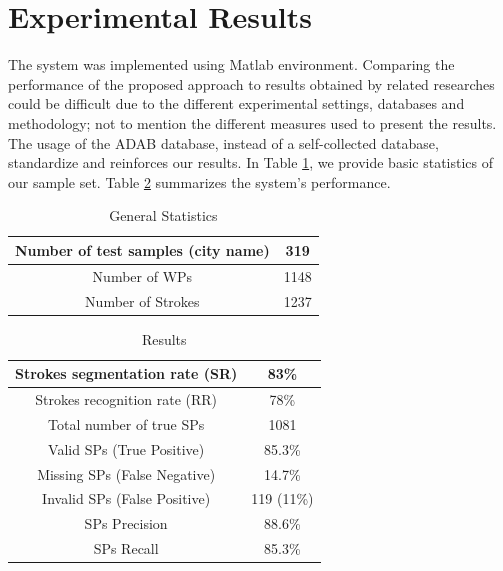 \documentclass[10pt, conference, compsocconf]{IEEEtran}
\begin{document}
\section{Experimental Results}
\label{sec:results}
The system was implemented using Matlab environment. 
Comparing the performance of the proposed approach to results obtained by related researches could be difficult due to the different experimental settings, databases and methodology; not to mention the different measures used to present the results. 
The usage of the ADAB database, instead of a self-collected database, standardize and reinforces our results. 
In Table \ref{table:general_stats}, we provide basic statistics of our sample set. 
Table \ref{table:results} summarizes the system's performance.

\begin{table}[b]
\caption{General Statistics}
\renewcommand{\arraystretch}{1.2}
\begin{tabular}{ | c | c | }
  \hline
  Number of test samples (city name) & 319 \\
  \hline
  Number of WPs & 1148 \\
  \hline
  Number of Strokes & 1237 \\
  \hline
\end{tabular}
\centering
\label{table:general_stats} 
\end{table}

\begin{table}[b]
\caption{Results}
\renewcommand{\arraystretch}{1.2}
\begin{tabular}{ | c | c | }
  \hline
  Strokes segmentation rate (SR) &  83\% \\ 
  \hline
  Strokes recognition rate (RR) &  78\% \\ 
 \hline
  Total number of true SPs & 1081 \\
  \hline
  Valid SPs (True Positive) & 85.3\% \\
    \hline
  Missing SPs (False Negative) & 14.7\% \\
  \hline
  Invalid SPs (False Positive) & 119 (11\%) \\
  \hline                                    
  SPs Precision & 88.6\% \\ 
 \hline
  SPs Recall &  85.3\% \\ 
 \hline
\end{tabular}
\centering
\label{table:results} 
\end{table}
\end{document}
